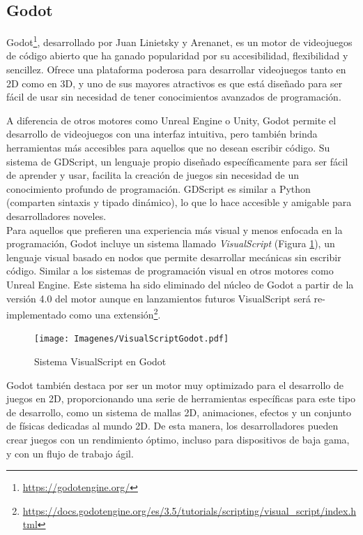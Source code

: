 \subsection{Godot}

Godot\footnote{\url{https://godotengine.org/}}, desarrollado por Juan Linietsky y Arenanet, es un motor de videojuegos de código abierto que ha ganado popularidad por su accesibilidad, flexibilidad y sencillez. Ofrece una plataforma poderosa para desarrollar videojuegos tanto en 2D como en 3D, y uno de sus mayores atractivos es que está diseñado para ser fácil de usar sin necesidad de tener conocimientos avanzados de programación.\

A diferencia de otros motores como Unreal Engine o Unity, Godot permite el desarrollo de videojuegos con una interfaz intuitiva, pero también brinda herramientas más accesibles para aquellos que no desean escribir código. Su sistema de GDScript, un lenguaje propio diseñado específicamente para ser fácil de aprender y usar, facilita la creación de juegos sin necesidad de un conocimiento profundo de programación. GDScript es similar a Python (comparten sintaxis y tipado dinámico), lo que lo hace accesible y amigable para desarrolladores noveles.\\

Para aquellos que prefieren una experiencia más visual y menos enfocada en la programación, Godot incluye un sistema llamado \textit{VisualScript} (Figura \ref{fig:Godot_VisualScript_Figure}), un lenguaje visual basado en nodos que permite desarrollar mecánicas sin escribir código. Similar a los sistemas de programación visual en otros motores como Unreal Engine. Este sistema ha sido eliminado del núcleo de Godot a partir de la versión 4.0 del motor aunque en lanzamientos futuros VisualScript será re-implementado como una extensión\footnote{\url{https://docs.godotengine.org/es/3.5/tutorials/scripting/visual_script/index.html}}.\\

\begin{figure}[t]
	\centering
	\texttt{[image: Imagenes/VisualScriptGodot.pdf]}
	\caption{Sistema VisualScript en Godot}
	\label{fig:Godot_VisualScript_Figure}
\end{figure}
Godot también destaca por ser un motor muy optimizado para el desarrollo de juegos en 2D, proporcionando una serie de herramientas específicas para este tipo de desarrollo, como un sistema de mallas 2D, animaciones, efectos y un conjunto de físicas dedicadas al mundo 2D. De esta manera, los desarrolladores pueden crear juegos con un rendimiento óptimo, incluso para dispositivos de baja gama, y con un flujo de trabajo ágil.\\

